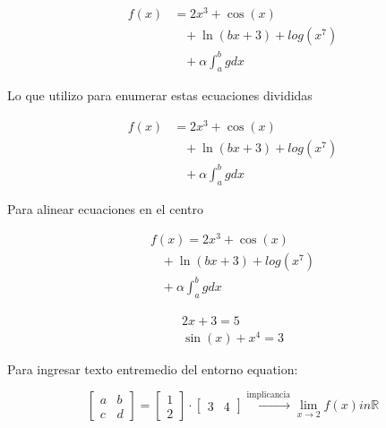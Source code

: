 \documentclass[12pt, letterpaper]{article}
\begin{document}
\begin{align}
    f(x) &= 2x^3+\cos(x) \\
         & \hspace{10pt} + \ln(bx+3) +log(x^7) \\ 
         & \hspace{10pt} + \alpha\int_a^b g dx 
\end{align}

Lo que utilizo para enumerar estas ecuaciones divididas

\begin{equation}
    \begin{split}
        f(x) & = 2x^3+\cos(x) \\
             & \hspace{10pt} + \ln(bx+3) +log(x^7) \\ 
            & \hspace{10pt} + \alpha\int_a^b g dx 
    \end{split}
    \label{eqn:ecuacion3}
\end{equation}

Para alinear ecuaciones en el centro

\begin{gather} %
    f(x) = 2x^3+\cos(x) \\
         \hspace{10pt} + \ln(bx+3) +log(x^7) \\ 
         \hspace{10pt} + \alpha\int_a^b g dx 
\end{gather}

\begin{gather} %
    2x+3=5 \\
    \sin(x) + x^4 = 3
\end{gather}

Para ingresar texto entremedio del entorno equation:

\begin{equation}
    \begin{bmatrix}
        a & b \\
        c & d
    \end{bmatrix}
    =
    \begin{bmatrix}
        1 \\
        2
    \end{bmatrix}
    \cdot
    \begin{bmatrix}
        3 & 4
    \end{bmatrix}
    \overset{\text{implicancia}}{\rightarrow}
    \lim_{x \to 2} f(x) in \mathbb{R}
\end{equation}
\end{document}
